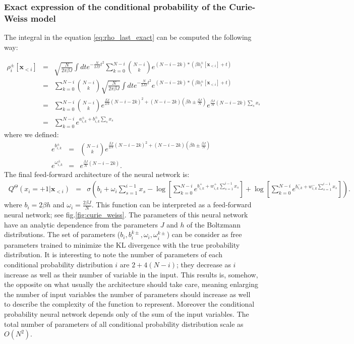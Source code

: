 \documentclass[aps,physrev,10pt,floatfix,longbibliography,nofootinbib,reprint]{revtex4-2}
\begin{document}
 \subsubsection{Exact expression of the conditional probability of the Curie-Weiss model}
 The integral in the equation \ref{eq:rho_last_exact} can be computed the following way:

 \begin{eqnarray*}
 \rho_i^{\pm}[\mathbf{x}_{<i}] &=& \sqrt{\frac{N}{2\pi \beta J}}\int dt e^{-\frac{N}{2J \beta}t^{2}} 
 \sum_{k=0}^{N-i} \binom{N-i}{k} e^{(N-i-2k)*(\beta h_i^{\pm}[\mathbf{x}_{<i}] + t)}\\
 &=& \sum_{k=0}^{N-i} \binom{N-i}{k} \sqrt{\frac{N}{2\pi \beta J}}\int dt e^{-\frac{N}{2J \beta}t^{2}} 
  e^{(N-i-2k)*(\beta h_i^{\pm}[\mathbf{x}_{<i}] + t)}\\
&=& \sum_{k=0}^{N-i} \binom{N-i}{k}e^{\frac{\beta J}{2N}\left(N-i-2k\right)^{2}+\left(N-i-2k\right)\left(\beta h \pm \frac{\beta J}{N}\right)} e^{\frac{\beta J}{N}\left(N-i-2k\right) \sum_s x_s} \\
&=& \sum_{k=0}^{N-i} e^{a_{i,k}^{\pm} + b_{i,k}^{\pm} \sum_s x_s} 
\end{eqnarray*}
where we defined:
\begin{eqnarray}
\label{eq:params}
e^{b_{i,k}^{\pm}} & = & \binom{N-i}{k}e^{\frac{\beta J}{2N}\left(N-i-2k\right)^{2}+\left(N-i-2k\right)\left(\beta h \pm \frac{\beta J}{N}\right)}\\
e^{\omega_{i,k}^{\pm}} & = & e^{\frac{\beta J}{N}\left(N-i-2k\right)}.
\end{eqnarray}
The final feed-forward architecture of the neural network is:
\begin{eqnarray}\
\label{eq:curie_weiss_cond}
Q^{\Theta}\left(x_{i}=+1|\mathbf{x}_{<i}\right) & = &  \sigma \left(b_{i}+\omega_{i}\sum_{s=1}^{i-1}x_{s}-\log\left[\sum_{k=0}^{N-i}e^{b_{i,k}^{+}+w_{i,k}^{+}\sum_{s=1}^{i-1}x_{s}}\right]+\log\left[\sum_{k=0}^{N-i}e^{b_{i,k}^{-} + w_{i,k}^{-}\sum_{s=1}^{i-1}x_{s}}\right]\right).
\end{eqnarray}
where $b_i=2\beta h$ and $\omega_i=\frac{2\beta J}{N}$. 
\newline
This function can be interpreted as a feed-forward neural network; see fig.\ref{fig:curie_weiss}. 
The parameters of this neural network have an analytic dependence from the parameters $J$ and $h$ of the Boltzmann distributions. 
The set of parameters ($b_i, b_i^{k\pm}, \omega_i, \omega_i^{k\pm}$) can be consider as free parameters trained to minimize the KL divergence with the true probability distribution. 
It is interesting to note the number of parameters of each conditional probability distribution $i$ are $2+4(N-i)$; they decrease as $i$ increase as well as their number of variable in the input. This results is, somehow, the opposite on what usually the architecture should take care, meaning enlarging the number of input variables the number of parameters should increase as well to describe the complexity of the function to represent. Moreover the conditional probability neural network depends only of the sum of the input variables.
The total number of parameters of all conditional probability distribution scale as $O(N^2)$. 
\end{document}
